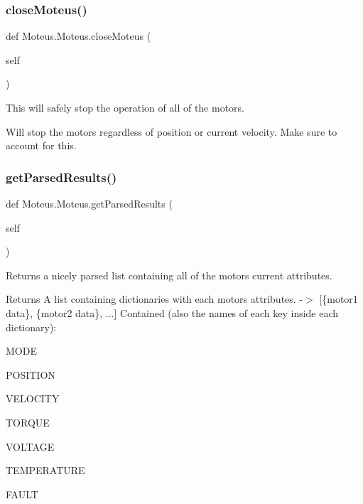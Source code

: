 \subsubsection{\texorpdfstring{close\+Moteus()}{closeMoteus()}}
{\footnotesize\ttfamily def Moteus.\+Moteus.\+close\+Moteus (\begin{DoxyParamCaption}\item[{}]{self }\end{DoxyParamCaption})}



This will safely stop the operation of all of the motors. 

Will stop the motors regardless of position or current velocity. Make sure to account for this. \mbox{\label{classMoteus_1_1Moteus_aa2ab74638356c8b9edb5ecf959c30645}} 
\subsubsection{\texorpdfstring{get\+Parsed\+Results()}{getParsedResults()}}
{\footnotesize\ttfamily def Moteus.\+Moteus.\+get\+Parsed\+Results (\begin{DoxyParamCaption}\item[{}]{self }\end{DoxyParamCaption})}



Returns a nicely parsed list containing all of the motor\textquotesingle{}s current attributes. 

\begin{DoxyReturn}{Returns}
A list containing dictionaries with each motor\textquotesingle{}s attributes. -\/$>$ \mbox{[}\{motor1 data\}, \{motor2 data\}, ...\mbox{]} Contained (also the names of each key inside each dictionary)\+:
\begin{DoxyItemize}
\item M\+O\+DE
\item P\+O\+S\+I\+T\+I\+ON
\item V\+E\+L\+O\+C\+I\+TY
\item T\+O\+R\+Q\+UE
\item V\+O\+L\+T\+A\+GE
\item T\+E\+M\+P\+E\+R\+A\+T\+U\+RE
\item F\+A\+U\+LT 
\end{DoxyItemize}
\end{DoxyReturn}
\mbox{\label{classMoteus_1_1Moteus_abb96e640583834610ef847305d02576f}} 
